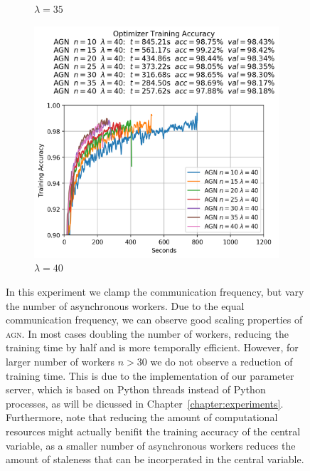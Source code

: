 \begin{figure}
\begin{subfigure}{.3\textwidth}
    \caption{$\lambda = 35$}
  \end{subfigure}
  \begin{subfigure}{.3\textwidth}
    \centering
    \includegraphics[width=\linewidth]{resources/images/agn_experiments_lambda_40}
    \caption{$\lambda = 40$}
  \end{subfigure}
  \caption{In this experiment we clamp the communication frequency, but vary the number of asynchronous workers. Due to the equal communication frequency, we can observe good scaling properties of \textsc{agn}. In most cases doubling the number of workers, reducing the training time by half and is more temporally efficient. However, for larger number of workers $n > 30$ we do not observe a reduction of training time. This is due to the implementation of our parameter server, which is based on Python threads instead of Python processes, as will be dicussed in Chapter~\ref{chapter:experiments}. Furthermore, note that reducing the amount of computational resources might actually benifit the training accuracy of the central variable, as a smaller number of asynchronous workers reduces the amount of staleness that can be incorperated in the central variable.}
  \label{fig:agn_experiments_lambdas}
\end{figure}

